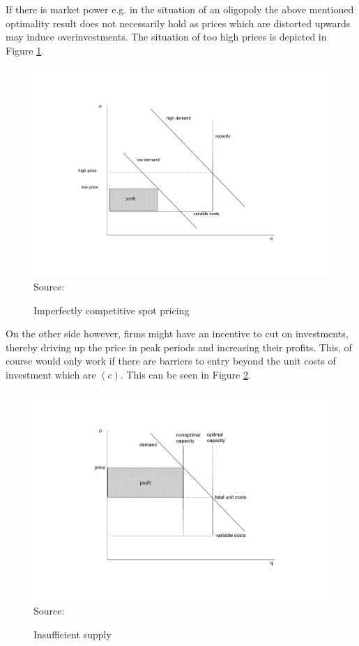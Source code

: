 If there is market power e.g. in the situation of an oligopoly the above mentioned optimality result does not necessarily hold as prices which are distorted upwards may induce overinvestments. The situation of too high prices is depicted in Figure \ref{peak_load_toohigh}. 

\begin{figure}[h]
\centering
\caption{Imperfectly competitive spot pricing}
\includegraphics[width=.6\textwidth]{capacity/imperfect_spot_pricing}
      \label{peak_load_toohigh}  
\\          
\scriptsize Source: \cite{Fehr1995}
\end{figure}

On the other side however, firms might have an incentive to cut on investments, thereby driving up the price in peak periods and increasing their profits. This, of course would only work if there are barriers to entry beyond the unit costs of investment which are $(c)$. This can be seen in Figure \ref{peak_load_insufficient}.

\begin{figure}[h]
\centering
\caption{Insufficient supply}
\includegraphics[width=.6\textwidth]{capacity/imperfect_spot_pricing2}
      \label{peak_load_insufficient}  
\\          
\scriptsize Source: \cite{Fehr1995}
\end{figure}

